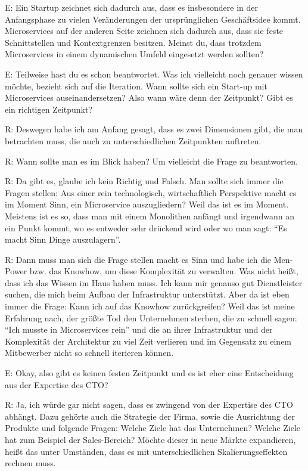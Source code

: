 E: Ein Startup zeichnet sich dadurch aus, dass es insbesondere in der Anfangsphase zu vielen Veränderungen der ursprünglichen Geschäftsidee kommt. Microservices auf der anderen Seite zeichnen sich dadurch aus, dass sie feste Schnittstellen und Kontextgrenzen besitzen. Meinst du, dass trotzdem Microservices in einem dynamischen Umfeld eingesetzt werden sollten?

E: Teilweise hast du es schon beantwortet. Was ich vielleicht noch genauer wissen möchte, bezieht sich auf die Iteration. Wann sollte sich ein Start-up mit Microservices auseinandersetzen? Also wann wäre denn der Zeitpunkt? Gibt es ein richtigen Zeitpunkt? 

R: Deswegen habe ich am Anfang gesagt, dass es zwei Dimensionen gibt, die man betrachten muss, die auch zu unterschiedlichen Zeitpunkten auftreten.

R: Wann sollte man es im Blick haben? Um vielleicht die Frage zu beantworten.

R: Da gibt es, glaube ich kein Richtig und Falsch. Man sollte sich immer die Fragen stellen: Aus einer rein technologisch, wirtschaftlich Perspektive macht es im Moment Sinn, ein Microservice auszugliedern? Weil das ist es im Moment.
Meistens ist es so, dass man mit einem Monolithen anfängt und irgendwann an ein Punkt kommt, wo es entweder sehr drückend wird oder wo man sagt: “Es macht Sinn Dinge auszulagern”.

R: Dann muss man sich die Frage stellen macht es Sinn und habe ich die Men-Power bzw. das Knowhow, um diese Komplexität zu verwalten. Was nicht heißt, dass ich das Wissen im Haus haben muss. Ich kann mir genauso gut Dienstleister suchen, die mich beim Aufbau der Infrastruktur unterstützt. Aber da ist eben immer die Frage: Kann ich auf das Knowhow zurückgreifen? Weil das ist meine Erfahrung nach, der größte Tod den Unternehmen sterben, die zu schnell sagen: “Ich musste in Microservices rein” und die an ihrer Infrastruktur und der Komplexität der Architektur zu viel Zeit verlieren und im Gegensatz zu einem Mitbewerber nicht so schnell iterieren können. 

E: Okay, also gibt es keinen festen Zeitpunkt und es ist eher eine Entscheidung aus der Expertise des CTO?

R: Ja, ich würde gar nicht sagen, dass es zwingend von der Expertise des CTO abhängt. Dazu gehörte auch die Strategie der Firma, sowie die Ausrichtung der Produkte und folgende Fragen: 
Welche Ziele hat das Unternehmen? Welche Ziele hat zum Beispiel der Sales-Bereich? Möchte dieser in neue Märkte expandieren, heißt das unter Umständen, dass es mit unterschiedlichen Skalierungseffekten rechnen muss.

